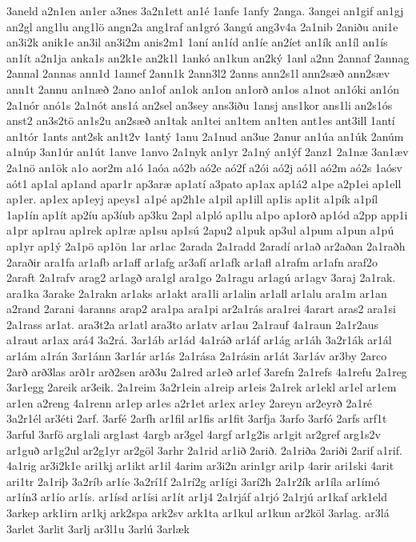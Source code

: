 {3aneld
a2n1en
an1er
a3nes
3a2n1ett
an1é
1anfe
1anfy
2anga.
3angei
an1gif
an1gj
an2gl
ang1lu
ang1lö
angn2a
ang1raf
an1gró
3angú
ang3v4a
2a1nib
2aniðu
ani1e
an3i2k
anik1e
an3il
an3i2m
anis2m1
1aní
an1íd
an1íe
an2íet
an1ík
an1íl
an1ís
an1ít
a2n1ja
anka1s
an2k1e
an2k1l
1ankó
an1kun
an2ký
1anl
a2nn
2annaf
2annag
2annal
2annas
ann1d
1annef
2ann1k
2ann3l2
2anns
ann2s1l
ann2sæð
ann2sæv
ann1t
2annu
an1næð
2ano
an1of
an1ok
an1on
an1orð
an1os
a1not
an1óki
an1ón
2a1nór
anó1s
2a1nót
ans1á
an2sel
an3sey
ans3iðu
1ansj
ans1kor
ans1li
an2s1ós
anst2
an3s2tö
an1s2u
an2sæð
an1tak
an1tei
an1tem
an1ten
ant1es
ant3ill
1antí
an1tór
1ants
ant2sk
an1t2v
1antý
1anu
2a1nud
an3ue
2anur
an1úa
an1úk
2anúm
a1núp
3an1úr
an1út
1anve
1anvo
2a1nyk
an1yr
2a1ný
an1ýf
2anz1
2a1næ
3an1æv
2a1nö
an1ök
a1o
aor2m
a1ó
1aóa
aó2b
aó2e
aó2f
a2ói
aó2j
aó1l
aó2m
aó2s
1aósv
aót1
ap1al
ap1and
apar1r
ap3aræ
ap1atí
a3pato
ap1ax
ap1á2
a1pe
a2p1ei
ap1ell
ap1er.
ap1ex
ap1eyj
apeys1
a1pé
ap2h1e
a1pil
ap1ill
ap1is
ap1it
a1pík
a1píl
1ap1ín
ap1ít
ap2íu
ap3íub
ap3ku
2apl
a1pló
ap1lu
a1po
ap1orð
ap1ód
a2pp
app1i
a1pr
ap1rau
ap1rek
ap1ræ
ap1su
ap1sú
2apu2
a1puk
ap3ul
a1pum
a1pun
a1pú
ap1yr
ap1ý
2a1pö
ap1ön
1ar
ar1ac
2arada
2a1radd
2aradí
ar1að
ar2aðan
2a1raðh
2araðir
ara1fa
ar1afb
ar1aff
ar1afg
ar3afí
ar1afk
ar1afl
a1rafm
ar1afn
araf2o
2araft
2a1rafv
arag2
ar1agð
ara1gl
ara1go
2a1ragu
ar1agú
ar1agv
3araj
2a1rak.
ara1ka
3arake
2a1rakn
ar1aks
ar1akt
ara1li
ar1alin
ar1all
ar1alu
ara1m
ar1an
a2rand
2arani
4aranns
arap2
ara1pa
ara1pi
ar2a1rás
ara1rei
4arart
aras2
ara1si
2a1rass
ar1at.
ara3t2a
ar1atl
ara3to
ar1atv
ar1au
2a1rauf
4a1raun
2a1r2aus
a1raut
ar1ax
ará4
3a2rá.
3ar1áb
ar1ád
4a1ráð
ar1áf
ar1ág
ar1áh
3a2r1ák
ar1ál
ar1ám
a1rán
3ar1ánn
3ar1ár
ar1ás
2a1rása
2a1rásin
ar1át
3ar1áv
ar3by
2arco
2arð
arð3las
arð1r
arð2sen
arð3u
2a1red
ar1eð
ar1ef
3arefn
2a1refs
4a1refu
2a1reg
3ar1egg
2areik
ar3eik.
2a1reim
3a2r1ein
a1reip
ar1eis
2a1rek
ar1ekl
ar1el
ar1em
ar1en
a2reng
4a1renn
ar1ep
ar1es
a2r1et
ar1ex
ar1ey
2areyn
ar2eyrð
2a1ré
3a2r1él
ar3éti
2arf.
3arfé
2arfh
ar1fil
ar1fis
ar1fit
3arfja
3arfo
3arfó
2arfs
arf1t
3arful
3arfö
arg1ali
arg1ast
4argb
ar3gel
4argf
ar1g2is
ar1git
ar2gref
arg1s2v
ar1guð
ar1g2ul
ar2g1yr
ar2göl
3arhr
2a1rid
ar1ið
2arið.
2a1riða
2ariði
2arif
a1rif.
4a1rig
ar3i2k1e
ari1kj
ar1ikt
ar1il
4arim
ar3i2n
arin1gr
ari1p
4arir
ari1ski
4arit
ari1tr
2a1riþ
3a2ríb
ar1íe
3a2rí1f
2a1rí2g
ar1ígi
3arí2h
2a1r2ík
ar1íla
ar1ímó
ar1ín3
ar1ío
ar1ís.
ar1ísd
ar1ísi
ar1ít
ar1j4
2a1rjáf
a1rjó
2a1rjú
ar1kaf
ark1eld
3arkep
ark1irn
ar1kj
ark2spa
ark2sv
ark1ta
ar1kul
ar1kun
ar2köl
3arlag.
ar3lá
3arlet
3arlit
3arlj
ar3l1u
3arlú
3arlæk
}

